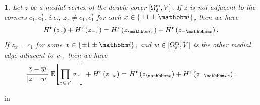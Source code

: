 \documentclass[12pt,oneside,english]{amsart}
\numberwithin{equation}{section}
\numberwithin{figure}{section}
\theoremstyle{plain}
\theoremstyle{plain}
\theoremstyle{plain}
\theoremstyle{plain}
\newtheorem{lem}[thm]{\protect\lemmaname}
\theoremstyle{remark}
\theoremstyle{definition}
\theoremstyle{plain}
\theoremstyle{plain}
\numberwithin{thm}{section}
\newcommand{\kallemod}[1]{{\color{kallecol} {#1}}}
\providecommand{\lemmaname}{Lemma}
\providecommand{\lemmaname}{Lemma}
\providecommand{\lemmaname}{Lemma}
\providecommand{\lemmaname}{Lemma}
\begin{document}
\begin{lem}
\label{lem:corner-discrete-hol}
Let $z$ be a medial vertex of the double cover ${\left[ {{\Omega}}_{{\delta}}^{\mathfrak{m}} , V \right]}$.
If $z$ is not adjacent to the corners
$c_{1}, c_{1}^*$, i.e., $z_{x} \neq c_{1}, c_{1}^*$ for each
$x\in\set{ \pm1\pm  \ii }$, then we have 
\begin{equation}
H^\corn \left(z_{x}\right) + H^\corn \left(z_{-x}\right)
= H^\corn \left(z_{\ii x}\right) + H^\corn \left(z_{-\ii x}\right) .
\label{eq:corner-discrete-hol-relation}
\end{equation}
If $z_{x}=c_{1}$ for some $x\in\set{ \pm1\pm  \ii }$,
and $w \in {\left[ {{\Omega}}_{{\delta}}^{\mathfrak{m}}, V \right]}$ is the other medial edge adjacent
to~$c_{1}$, then we have
\begin{equation}
\frac{\cconj{z}-\cconj{w}}{\left|z-w\right|} \;
    \correl{ \prod_{x\in V} \spin_{x} }
 + H^\corn \left(z_{-x}\right)
= H^\corn \left(z_{\ii x}\right) + H^\corn \left(z_{-\ii x}\right) .
\label{eq:corner-discrete-sing-relation}
\end{equation}
\end{lem}
% 
% 
in 
\end{document}

